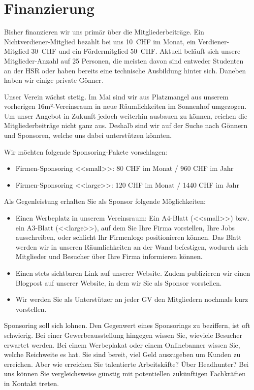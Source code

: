 \documentclass[10pt,a4paper,parskip,fleqn]{scrartcl}
\begin{document}
\section{Finanzierung}

Bisher finanzieren wir uns primär über die Mitgliederbeiträge. Ein
Nichtverdiener-Mitglied bezahlt bei uns 10~CHF im Monat, ein Verdiener-Mitglied
30~CHF und ein Fördermitglied 50~CHF. Aktuell beläuft sich unsere
Mitglieder-Anzahl auf 25 Personen, die meisten davon sind entweder Studenten an
der HSR oder haben bereits eine technische Ausbildung hinter sich. Daneben haben
wir einige private Gönner.

Unser Verein wächst stetig. Im Mai sind wir aus Platzmangel aus unserem
vorherigen 16m²-Vereinsraum in neue Räumlichkeiten im Sonnenhof umgezogen. Um
unser Angebot in Zukunft jedoch weiterhin ausbauen zu können, reichen die
Mitgliederbeiträge nicht ganz aus. Deshalb sind wir auf der Suche nach Gönnern
und Sponsoren, welche uns dabei unterstützen könnten.

Wir möchten folgende Sponsoring-Pakete vorschlagen:

\begin{itemize}
	\item Firmen-Sponsoring <<small>>: 80 CHF im Monat / 960 CHF im Jahr	
	\item Firmen-Sponsoring <<large>>: 120 CHF im Monat / 1440 CHF im Jahr	
\end{itemize}

Als Gegenleistung erhalten Sie als Sponsor folgende Möglichkeiten:

\begin{itemize}
	\item Einen Werbeplatz in unserem Vereinsraum: Ein A4-Blatt (<<small>>) bzw.
		ein A3-Blatt (<<large>>), auf dem Sie Ihre Firma vorstellen, Ihre Jobs
		ausschreiben, oder schlicht Ihr Firmenlogo positionieren können. Das Blatt
		werden wir in unseren Räumlichkeiten an der Wand befestigen, wodurch sich
		Mitglieder und Besucher über Ihre Firma informieren können.
	\item Einen stets sichtbaren Link auf unserer Website. Zudem publizieren wir
		einen Blogpost auf unserer Website, in dem wir Sie als Sponsor vorstellen.
	\item Wir werden Sie als Unterstützer an jeder GV den Mitgliedern nochmals
		kurz vorstellen.
\end{itemize}

Sponsoring soll sich lohnen. Den Gegenwert eines Sponsorings zu beziffern, ist
oft schwierig. Bei einer Gewerbeausstellung hingegen wissen Sie, wieviele
Besucher erwartet werden. Bei einem Werbeplakat oder einem Onlinebanner wissen
Sie, welche Reichweite es hat. Sie sind bereit, viel Geld auszugeben um Kunden
zu erreichen. Aber wie erreichen Sie talentierte Arbeitskäfte? Über Headhunter?
Bei uns können Sie vergleichsweise günstig mit potentiellen zukünftigen
Fachkräften in Kontakt treten.
\end{document}
